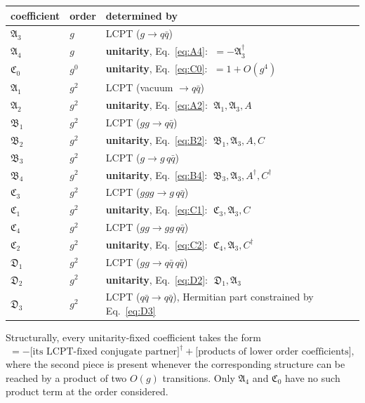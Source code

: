 \documentclass[11pt]{article}
\newcommand{\mf}{\mathfrak}
\newcommand{\dg}{\dagger}
\begin{document}
\begin{center}
\renewcommand{\arraystretch}{1.3}
\begin{tabular}{lll}
\hline
coefficient & order & determined by\\
\hline
$\mf A_{3}$ & $g$ & LCPT ($g\to q\bar q$)\\
$\mf A_{4}$ & $g$ & \textbf{unitarity}, Eq.~\eqref{eq:A4}: $\;=-\mf A^{\dg}_{3}$\\
$\mf C_{0}$ & $g^{0}$ & \textbf{unitarity}, Eq.~\eqref{eq:C0}: $\;=1+O(g^{4})$\\
$\mf A_{1}$ & $g^{2}$ & LCPT (vacuum $\to q\bar q$)\\
$\mf A_{2}$ & $g^{2}$ & \textbf{unitarity}, Eq.~\eqref{eq:A2}: $\;\mf A_{1},\mf A_{3},A$\\
$\mf B_{1}$ & $g^{2}$ & LCPT ($gg\to q\bar q$)\\
$\mf B_{2}$ & $g^{2}$ & \textbf{unitarity}, Eq.~\eqref{eq:B2}: $\;\mf B_{1},\mf A_{3},A,C$\\
$\mf B_{3}$ & $g^{2}$ & LCPT ($g\to g\,q\bar q$)\\
$\mf B_{4}$ & $g^{2}$ & \textbf{unitarity}, Eq.~\eqref{eq:B4}: $\;\mf B_{3},\mf A_{3},A^{\dg},C^{\dg}$\\
$\mf C_{3}$ & $g^{2}$ & LCPT ($ggg\to g\,q\bar q$)\\
$\mf C_{1}$ & $g^{2}$ & \textbf{unitarity}, Eq.~\eqref{eq:C1}: $\;\mf C_{3},\mf A_{3},C$\\
$\mf C_{4}$ & $g^{2}$ & LCPT ($gg\to gg\,q\bar q$)\\
$\mf C_{2}$ & $g^{2}$ & \textbf{unitarity}, Eq.~\eqref{eq:C2}: $\;\mf C_{4},\mf A_{3},C^{\dg}$\\
$\mf D_{1}$ & $g^{2}$ & LCPT ($gg\to q\bar q\,q\bar q$)\\
$\mf D_{2}$ & $g^{2}$ & \textbf{unitarity}, Eq.~\eqref{eq:D2}: $\;\mf D_{1},\mf A_{3}$\\
$\mf D_{3}$ & $g^{2}$ & LCPT ($q\bar q\to q\bar q$), Hermitian part constrained by Eq.~\eqref{eq:D3}\\
\hline
\end{tabular}
\end{center}

\noindent
Structurally, every unitarity-fixed coefficient takes the form
\begin{equation}
[\text{unitarity-fixed}]=-\big[\text{its LCPT-fixed conjugate partner}\big]^{\dg}
+\big[\text{products of lower order coefficients}\big],
\end{equation}
where the second piece is present whenever the corresponding structure can be reached by a
product of two $O(g)$ transitions. Only $\mf A_{4}$ and $\mf C_{0}$ have no such product term at
the order considered.
\end{document}
